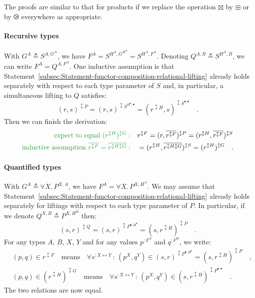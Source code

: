 The proofs are similar to that for products if we replace the operation
$\boxtimes$ by $\boxplus$ or by $\ogreaterthan$ everywhere as appropriate.

\paragraph{Recursive types}

With $G^{A}\triangleq S^{A,G^{A}}$, we have $F^{A}=S^{H^{A},G^{H^{A}}}=S^{H^{A},F^{A}}$.
Denoting $Q^{A,B}\triangleq S^{H^{A},B}$, we can write $F^{A}=Q^{A,F^{A}}$.
One inductive assumption is that Statement~\ref{subsec:Statement-functor-composition-relational-lifting}
already holds separately with respect to each type parameter of $S$
and, in particular, a simultaneous lifting to $Q$ satisfies:
\[
(r,s)^{\updownarrow P}=(r,s)^{\updownarrow S^{H^{\bullet},\bullet}}=(r^{\updownarrow H},s)^{\updownarrow S^{\bullet,\bullet}}\quad.
\]
Then we can finish the derivation:
\begin{align*}
{\color{greenunder}\text{expect to equal }(r^{\updownarrow H})^{\updownarrow G}:}\quad & r^{\updownarrow F}=(r,\overline{r^{\updownarrow F}})^{\updownarrow P}=(r^{\updownarrow H},\overline{r^{\updownarrow F}})^{\updownarrow S}\\
{\color{greenunder}\text{inductive assumption }\overline{r^{\updownarrow F}}=\overline{r^{\updownarrow H\updownarrow G}}:}\quad & =(r^{\updownarrow H},\overline{r^{\updownarrow H\updownarrow G}})^{\updownarrow S}=(r^{\updownarrow H})^{\updownarrow G}\quad.
\end{align*}


\paragraph{Quantified types}

With $G^{A}\triangleq\forall X.\,P^{X,A}$, we have $F^{A}=\forall X.\,P^{X,H^{A}}$.
We may assume that Statement~\ref{subsec:Statement-functor-composition-relational-lifting}
already holds separately for liftings with respect to each type parameter
of $P$. In particular, if we denote $Q^{X,B}\triangleq P^{X,H^{B}}$
then:
\[
(s,r)^{\updownarrow Q}=(s,r)^{\updownarrow P^{\bullet,H^{\bullet}}}=(s,r^{\updownarrow H})^{\updownarrow P}\quad.
\]
For any types $A$, $B$, $X$, $Y$ and for any values $p^{:F^{A}}$
and $q^{:F^{B}}$, we write:
\begin{align*}
 & (p,q)\in r^{\updownarrow F}\quad\text{means}\quad\forall s^{:X\leftrightarrow Y}\,:\,(p^{X},q^{Y})\in(s,r)^{\updownarrow P^{\bullet,H^{\bullet}}}=(s,r^{\updownarrow H})^{\updownarrow P}\quad,\\
 & (p,q)\in(r^{\updownarrow H})^{\updownarrow G}\quad\text{means}\quad\forall s^{:X\leftrightarrow Y}\,:\,(p^{X},q^{Y})\in(s,r^{\updownarrow H})^{\updownarrow P^{\bullet,\bullet}}\quad.
\end{align*}
The two relations are now equal. 

